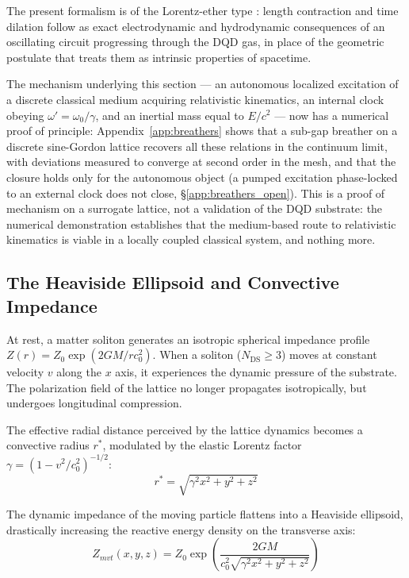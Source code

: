 \documentclass[11pt,a4paper]{article}
\theoremstyle{plain}
\theoremstyle{remark}
\newcommand{\Ncd}{\ensuremath{N_{\mathrm{DS}}}}
\begin{document}
The present formalism is of the Lorentz-ether type \cite{einstein1920}: length contraction and time dilation follow as exact electrodynamic and hydrodynamic consequences of an oscillating circuit progressing through the DQD gas, in place of the geometric postulate that treats them as intrinsic properties of spacetime.

The mechanism underlying this section --- an autonomous localized excitation of a discrete classical medium acquiring relativistic kinematics, an internal clock obeying $\omega' = \omega_0/\gamma$, and an inertial mass equal to $E/c^2$ --- now has a numerical proof of principle: Appendix~\ref{app:breathers} shows that a sub-gap breather on a discrete sine-Gordon lattice recovers all these relations in the continuum limit, with deviations measured to converge at second order in the mesh, and that the closure holds only for the autonomous object (a pumped excitation phase-locked to an external clock does not close, \S\ref{app:breathers_open}). This is a proof of mechanism on a surrogate lattice, not a validation of the DQD substrate: the numerical demonstration establishes that the medium-based route to relativistic kinematics is viable in a locally coupled classical system, and nothing more.

\subsection{The Heaviside Ellipsoid and Convective Impedance}

At rest, a matter soliton generates an isotropic spherical impedance profile $Z(r) = Z_0 \exp(2GM/rc_0^2)$. When a soliton ($\Ncd \ge 3$) moves at constant velocity $v$ along the $x$ axis, it experiences the dynamic pressure of the substrate. The polarization field of the lattice no longer propagates isotropically, but undergoes longitudinal compression.

The effective radial distance perceived by the lattice dynamics becomes a convective radius $r^*$, modulated by the elastic Lorentz factor $\gamma = (1 - v^2/c_0^2)^{-1/2}$:
\begin{equation}
r^* = \sqrt{\gamma^2 x^2 + y^2 + z^2}
\end{equation}

The dynamic impedance of the moving particle flattens into a Heaviside ellipsoid, drastically increasing the reactive energy density on the transverse axis:
\begin{equation}
Z_{mvt}(x,y,z) = Z_0 \exp\left( \frac{2GM}{c_0^2 \sqrt{\gamma^2 x^2 + y^2 + z^2}} \right)
\end{equation}
\end{document}
